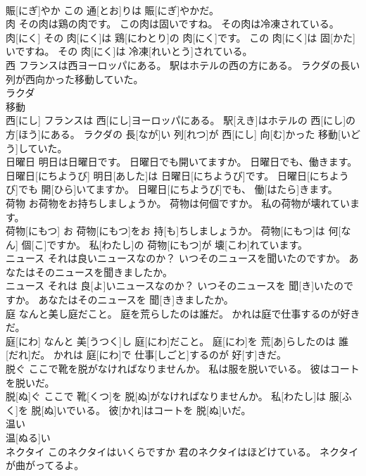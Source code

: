 \documentclass[8pt]{extreport}
\begin{document}
\begin{CJK}{UTF8}{min}
\\	賑[にぎ]やか この 通[とお]りは 賑[にぎ]やかだ。
\\	肉 その肉は鶏の肉です。 この肉は固いですね。 その肉は冷凍されている。	
\\	肉[にく] その 肉[にく]は 鶏[にわとり]の 肉[にく]です。 この 肉[にく]は 固[かた]いですね。 その 肉[にく]は 冷凍[れいとう]されている。
\\	西 フランスは西ヨーロッパにある。 駅はホテルの西の方にある。 ラクダの長い列が西向かった移動していた。	
\\	ラクダ 
\\	移動 
\\	西[にし] フランスは 西[にし]ヨーロッパにある。 駅[えき]はホテルの 西[にし]の 方[ほう]にある。 ラクダの 長[なが]い 列[れつ]が 西[にし] 向[む]かった 移動[いどう]していた。
\\	日曜日 明日は日曜日です。 日曜日でも開いてますか。 日曜日でも、働きます。	
\\	日曜日[にちようび] 明日[あした]は 日曜日[にちようび]です。 日曜日[にちようび]でも 開[ひら]いてますか。 日曜日[にちようび]でも、 働[はたら]きます。
\\	荷物 お荷物をお持ちしましょうか。 荷物は何個ですか。 私の荷物が壊れています。	
\\	荷物[にもつ] お 荷物[にもつ]をお 持[も]ちしましょうか。 荷物[にもつ]は 何[なん] 個[こ]ですか。 私[わたし]の 荷物[にもつ]が 壊[こわ]れています。
\\	ニュース それは良いニュースなのか？ いつそのニュースを聞いたのですか。 あなたはそのニュースを聞きましたか。	
\\	ニュース それは 良[よ]いニュースなのか？ いつそのニュースを 聞[き]いたのですか。 あなたはそのニュースを 聞[き]きましたか。
\\	庭 なんと美し庭だこと。 庭を荒らしたのは誰だ。 かれは庭で仕事するのが好きだ。	
\\	庭[にわ] なんと 美[うつく]し 庭[にわ]だこと。 庭[にわ]を 荒[あ]らしたのは 誰[だれ]だ。 かれは 庭[にわ]で 仕事[しごと]するのが 好[す]きだ。
\\	脱ぐ ここで靴を脱がなければなりませんか。 私は服を脱いでいる。 彼はコートを脱いだ。	
\\	脱[ぬ]ぐ ここで 靴[くつ]を 脱[ぬ]がなければなりませんか。 私[わたし]は 服[ふく]を 脱[ぬ]いでいる。 彼[かれ]はコートを 脱[ぬ]いだ。
\\	温い	
\\	温[ぬる]い
\\	ネクタイ このネクタイはいくらですか 君のネクタイはほどけている。 ネクタイが曲がってるよ。	

\end{CJK}
\end{document}
